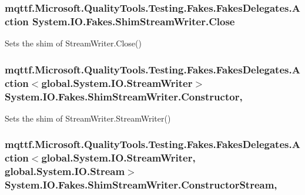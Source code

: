 \hypertarget{class_system_1_1_i_o_1_1_fakes_1_1_shim_stream_writer_a6d57e65d90d172281414209c6854ba1b}{
\subsubsection[{Close}]{\setlength{\rightskip}{0pt plus 5cm}mqttf.\-Microsoft.\-Quality\-Tools.\-Testing.\-Fakes.\-Fakes\-Delegates.\-Action System.\-I\-O.\-Fakes.\-Shim\-Stream\-Writer.\-Close\hspace{0.3cm}{\ttfamily [set]}}}\label{class_system_1_1_i_o_1_1_fakes_1_1_shim_stream_writer_a6d57e65d90d172281414209c6854ba1b}


Sets the shim of Stream\-Writer.\-Close()

\hypertarget{class_system_1_1_i_o_1_1_fakes_1_1_shim_stream_writer_a74a23566523a9ac51d2fbad5f4b821cf}{
\subsubsection[{Constructor}]{\setlength{\rightskip}{0pt plus 5cm}mqttf.\-Microsoft.\-Quality\-Tools.\-Testing.\-Fakes.\-Fakes\-Delegates.\-Action$<$global.\-System.\-I\-O.\-Stream\-Writer$>$ System.\-I\-O.\-Fakes.\-Shim\-Stream\-Writer.\-Constructor\hspace{0.3cm}{\ttfamily [static]}, {\ttfamily [set]}}}\label{class_system_1_1_i_o_1_1_fakes_1_1_shim_stream_writer_a74a23566523a9ac51d2fbad5f4b821cf}


Sets the shim of Stream\-Writer.\-Stream\-Writer()

\hypertarget{class_system_1_1_i_o_1_1_fakes_1_1_shim_stream_writer_ae72bbf1b495163689b121fc5abf3990f}{
\subsubsection[{Constructor\-Stream}]{\setlength{\rightskip}{0pt plus 5cm}mqttf.\-Microsoft.\-Quality\-Tools.\-Testing.\-Fakes.\-Fakes\-Delegates.\-Action$<$global.\-System.\-I\-O.\-Stream\-Writer, global.\-System.\-I\-O.\-Stream$>$ System.\-I\-O.\-Fakes.\-Shim\-Stream\-Writer.\-Constructor\-Stream\hspace{0.3cm}{\ttfamily [static]}, {\ttfamily [set]}}}\label{class_system_1_1_i_o_1_1_fakes_1_1_shim_stream_writer_ae72bbf1b495163689b121fc5abf3990f}


